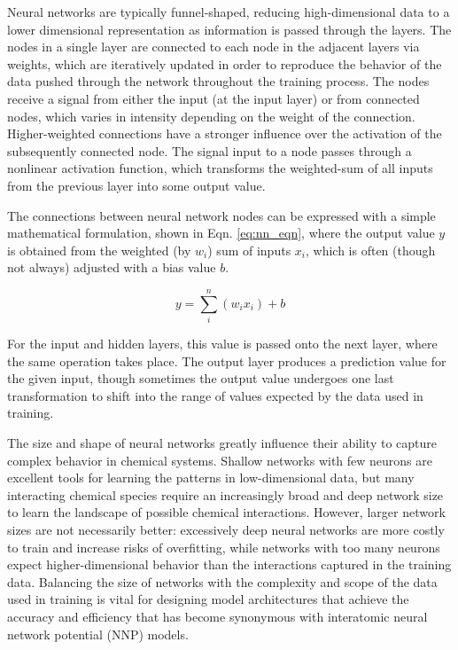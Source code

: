 Neural networks are typically funnel-shaped, reducing high-dimensional data to a lower dimensional representation as information is passed through the layers. 
The nodes in a single layer are connected to each node in the adjacent layers via weights, which are iteratively updated in order to reproduce the behavior of the data pushed through the network throughout the training process. 
The nodes receive a signal from either the input (at the input layer) or from connected nodes, which varies in intensity depending on the weight of the connection.
Higher-weighted connections have a stronger influence over the activation of the subsequently connected node.
The signal input to a node passes through a nonlinear activation function, which transforms the weighted-sum of all inputs from the previous layer into some output value.

The connections between neural network nodes can be expressed with a simple mathematical formulation, shown in Eqn. \ref{eq:nn_eqn}, where the output value $y$ is obtained from the weighted (by $w_i$) sum of inputs $x_i$, which is often (though not always) adjusted with a bias value $b$. 

\begin{equation}
y = \sum_{i}^{n} (w_i x_i) + b
\label{eq:nn_eqn}
\end{equation}

For the input and hidden layers, this value is passed onto the next layer, where the same operation takes place.
The output layer produces a prediction value for the given input, though sometimes the output value undergoes one last transformation to shift into the range of values expected by the data used in training.

The size and shape of neural networks greatly influence their ability to capture complex behavior in chemical systems.
Shallow networks with few neurons are excellent tools for learning the patterns in low-dimensional data, but many interacting chemical species require an increasingly broad and deep network size to learn the landscape of possible chemical interactions.
However, larger network sizes are not necessarily better: excessively deep neural networks are more costly to train and increase risks of overfitting, while networks with too many neurons expect higher-dimensional behavior than the interactions captured in the training data.
Balancing the size of networks with the complexity and scope of the data used in training is vital for designing model architectures that achieve the accuracy and efficiency that has become synonymous with interatomic neural network potential (NNP) models. 

